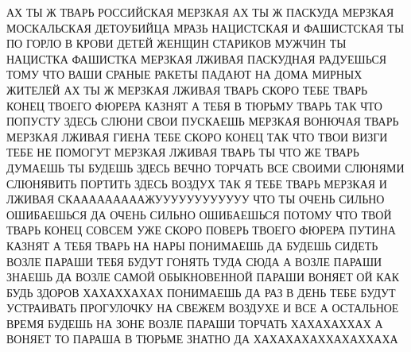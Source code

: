  
 
 
 
 

АХ ТЫ Ж ТВАРЬ РОССИЙСКАЯ МЕРЗКАЯ АХ ТЫ Ж ПАСКУДА МЕРЗКАЯ МОСКАЛЬСКАЯ ДЕТОУБИЙЦА
МРАЗЬ НАЦИСТСКАЯ И ФАШИСТСКАЯ ТЫ ПО ГОРЛО В КРОВИ ДЕТЕЙ ЖЕНЩИН СТАРИКОВ МУЖЧИН
ТЫ НАЦИСТКА ФАШИСТКА МЕРЗКАЯ ЛЖИВАЯ ПАСКУДНАЯ РАДУЕШЬСЯ ТОМУ ЧТО ВАШИ СРАНЫЕ
РАКЕТЫ ПАДАЮТ НА ДОМА МИРНЫХ ЖИТЕЛЕЙ АХ ТЫ Ж МЕРЗКАЯ ЛЖИВАЯ ТВАРЬ СКОРО ТЕБЕ
ТВАРЬ КОНЕЦ ТВОЕГО ФЮРЕРА КАЗНЯТ А ТЕБЯ В ТЮРЬМУ ТВАРЬ ТАК ЧТО ПОПУСТУ ЗДЕСЬ
СЛЮНИ СВОИ ПУСКАЕШЬ МЕРЗКАЯ ВОНЮЧАЯ ТВАРЬ МЕРЗКАЯ ЛЖИВАЯ ГИЕНА ТЕБЕ СКОРО КОНЕЦ
ТАК ЧТО ТВОИ ВИЗГИ ТЕБЕ НЕ ПОМОГУТ МЕРЗКАЯ ЛЖИВАЯ ТВАРЬ ТЫ ЧТО ЖЕ ТВАРЬ ДУМАЕШЬ
ТЫ БУДЕШЬ ЗДЕСЬ ВЕЧНО ТОРЧАТЬ ВСЕ СВОИМИ СЛЮНЯМИ СЛЮНЯВИТЬ ПОРТИТЬ ЗДЕСЬ ВОЗДУХ
ТАК Я ТЕБЕ ТВАРЬ МЕРЗКАЯ И ЛЖИВАЯ СКАААААААААЖУУУУУУУУУУУУ ЧТО ТЫ ОЧЕНЬ СИЛЬНО
ОШИБАЕШЬСЯ ДА ОЧЕНЬ СИЛЬНО ОШИБАЕШЬСЯ ПОТОМУ ЧТО ТВОЙ ТВАРЬ КОНЕЦ СОВСЕМ УЖЕ
СКОРО ПОВЕРЬ ТВОЕГО ФЮРЕРА ПУТИНА КАЗНЯТ А ТЕБЯ ТВАРЬ НА НАРЫ ПОНИМАЕШЬ ДА
БУДЕШЬ СИДЕТЬ ВОЗЛЕ ПАРАШИ ТЕБЯ БУДУТ ГОНЯТЬ ТУДА СЮДА А ВОЗЛЕ ПАРАШИ ЗНАЕШЬ ДА
ВОЗЛЕ САМОЙ ОБЫКНОВЕННОЙ ПАРАШИ ВОНЯЕТ ОЙ КАК БУДЬ ЗДОРОВ ХАХАХХАХАХ ПОНИМАЕШЬ
ДА РАЗ В ДЕНЬ ТЕБЕ БУДУТ УСТРАИВАТЬ ПРОГУЛОЧКУ НА СВЕЖЕМ ВОЗДУХЕ И ВСЕ А
ОСТАЛЬНОЕ ВРЕМЯ БУДЕШЬ НА ЗОНЕ ВОЗЛЕ ПАРАШИ ТОРЧАТЬ ХАХАХАХХАХ А ВОНЯЕТ ТО
ПАРАША В ТЮРЬМЕ ЗНАТНО ДА ХАХАХАХАХХАХАХХАХА
